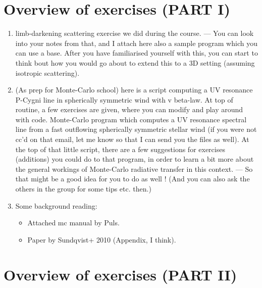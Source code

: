 \documentclass[../main/main.tex]{subfiles}
\begin{document}
\section{Overview of exercises (PART I)}

\begin{enumerate}
\item limb-darkening scattering exercise we did during the course. 
— You can look into your notes from that, and I attach here also a sample program which you can use a base. After you have familiarised yourself with this, you can start to think bout how you would go about to extend this to a 3D setting (assuming isotropic scattering). 

\item (As prep for Monte-Carlo school) here is a script computing a UV resonance P-Cygni line in spherically symmetric wind with v beta-law. At top of routine, a few exercises are given, where you can modify and play around with code. Monte-Carlo program which computes a UV resonance spectral line from a fast outflowing spherically symmetric stellar wind (if you were not cc’d on that email, let me know so that I can send you the files as well). At the top of that little script, there are a few suggestions for exercises (additions) you could do to that program, in order to learn a bit more about the general workings of Monte-Carlo radiative transfer in this context.  
— So that might be a good idea for you to do as well !   (And you can also ask the others in the group for some tips etc. then.) 

\item Some background reading: 
\begin{itemize}
\item Attached mc manual by Puls. 
\item Paper by Sundqvist+ 2010 (Appendix, I think). 
\end{itemize}
\end{enumerate}


\section{Overview of exercises (PART II)}
\label{Overview_Part_2}
\end{document}
